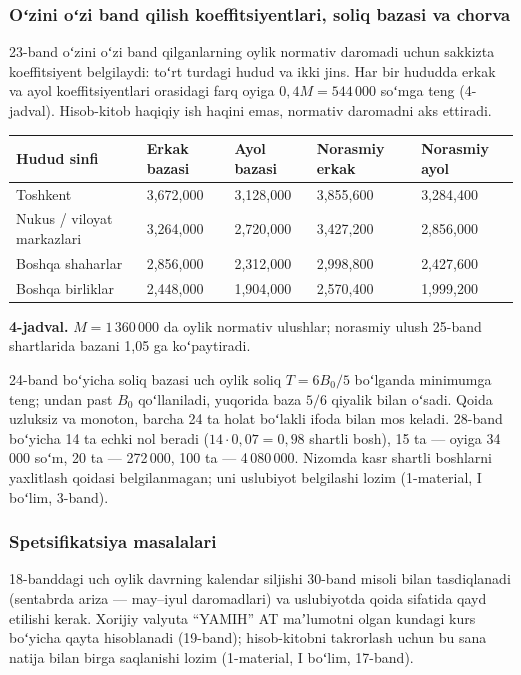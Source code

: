 \documentclass[14pt,a4paper]{extarticle}
\begin{document}
\subsubsection{Oʻzini oʻzi band qilish koeffitsiyentlari, soliq bazasi va chorva}\label{res:coef}
23-band oʻzini oʻzi band qilganlarning oylik normativ daromadi uchun sakkizta koeffitsiyent belgilaydi: toʻrt turdagi hudud va ikki jins. Har bir hududda erkak va ayol koeffitsiyentlari orasidagi farq oyiga $0{,}4M=544\,000$ soʻmga teng (4-jadval). Hisob-kitob haqiqiy ish haqini emas, normativ daromadni aks ettiradi.

\begingroup\fontsize{11bp}{13.2bp}\selectfont
\begin{longtable}{p{} p{} p{} p{} p{}}
\toprule
Hudud sinfi & Erkak bazasi & Ayol bazasi & Norasmiy erkak & Norasmiy ayol \\
\midrule
\endhead
Toshkent & 3,672,000 & 3,128,000 & 3,855,600 & 3,284,400 \\
Nukus / viloyat markazlari & 3,264,000 & 2,720,000 & 3,427,200 & 2,856,000 \\
Boshqa shaharlar & 2,856,000 & 2,312,000 & 2,998,800 & 2,427,600 \\
Boshqa birliklar & 2,448,000 & 1,904,000 & 2,570,400 & 1,999,200 \\
\bottomrule
\end{longtable}
\endgroup
\textbf{4-jadval.} $M=1\,360\,000$ da oylik normativ ulushlar; norasmiy ulush 25-band shartlarida bazani 1,05 ga koʻpaytiradi.

24-band boʻyicha soliq bazasi uch oylik soliq $T=6B_0/5$ boʻlganda minimumga teng; undan past $B_0$ qoʻllaniladi, yuqorida baza $5/6$ qiyalik bilan oʻsadi. Qoida uzluksiz va monoton, barcha 24 ta holat boʻlakli ifoda bilan mos keladi. 28-band boʻyicha 14 ta echki nol beradi ($14\cdot0{,}07=0{,}98$ shartli bosh), 15 ta — oyiga 34\,000 soʻm, 20 ta — 272\,000, 100 ta — 4\,080\,000. Nizomda kasr shartli boshlarni yaxlitlash qoidasi belgilanmagan; uni uslubiyot belgilashi lozim (1-material, I boʻlim, 3-band).

\subsubsection{Spetsifikatsiya masalalari}\label{res:spec}
18-banddagi uch oylik davrning kalendar siljishi 30-band misoli bilan tasdiqlanadi (sentabrda ariza — may–iyul daromadlari) va uslubiyotda qoida sifatida qayd etilishi kerak. Xorijiy valyuta “YAMIH” AT maʼlumotni olgan kundagi kurs boʻyicha qayta hisoblanadi (19-band); hisob-kitobni takrorlash uchun bu sana natija bilan birga saqlanishi lozim (1-material, I boʻlim, 17-band).
\end{document}
